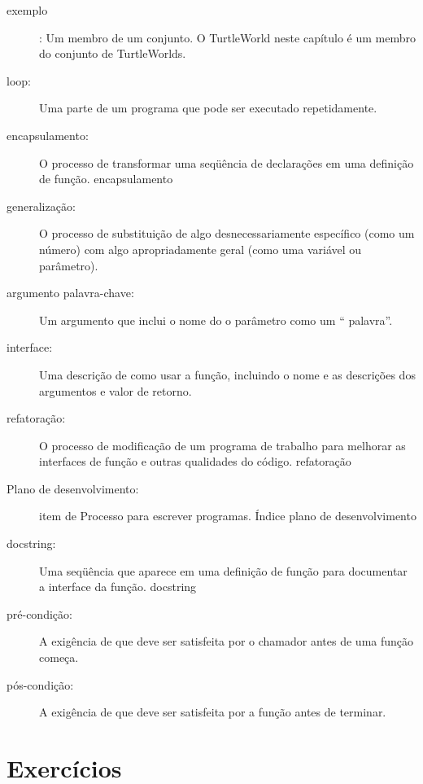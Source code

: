 \documentclass[10pt]{book}
\begin{document}
\begin{description}

\item[exemplo]: Um membro de um conjunto. O TurtleWorld neste
capítulo é um membro do conjunto de TurtleWorlds.

\item[loop:] Uma parte de um programa que pode ser executado repetidamente.

\item[encapsulamento:] O processo de transformar uma seqüência de
declarações em uma definição de função.
\index{} encapsulamento

\item[generalização:] O processo de substituição de algo
desnecessariamente específico (como um número) com algo apropriadamente
geral (como uma variável ou parâmetro).

\item[argumento palavra-chave:] Um argumento que inclui o nome do
o parâmetro como um `` palavra''.

\item[interface:] Uma descrição de como usar a função, incluindo
o nome e as descrições dos argumentos e valor de retorno.

\item[refatoração:] O processo de modificação de um programa de trabalho para
  melhorar as interfaces de função e outras qualidades do código.
\index{} refatoração

\item[Plano de desenvolvimento:] item de Processo para escrever programas.
\index{} Índice plano de desenvolvimento

\item[docstring:] Uma seqüência que aparece em uma definição de função
para documentar a interface da função.
\index{} docstring

\item[pré-condição:] A exigência de que deve ser satisfeita por
o chamador antes de uma função começa.

\item[pós-condição:] A exigência de que deve ser satisfeita por
a função antes de terminar.

\end{description}


\section{Exercícios}
\end{document}
